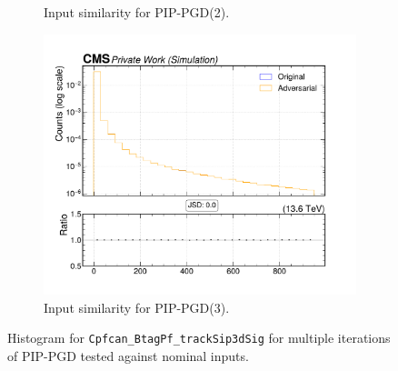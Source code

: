 \begin{figure}[htbp]
\begin{subfigure}[t]{0.32\textwidth}
    \caption*{Input similarity for PIP-PGD(2).}
  \end{subfigure}\hfill
  \begin{subfigure}[t]{0.32\textwidth}
    \includegraphics[width=\linewidth]{media/output/features/compare/combined_it_3/cmp_cpf_arr_Cpfcan_BtagPf_trackSip3dSig.pdf}
    \caption*{Input similarity for PIP-PGD(3).}
  \end{subfigure}

  \caption*{Histogram for \texttt{Cpfcan\_BtagPf\_trackSip3dSig} for multiple iterations of PIP-PGD tested against nominal inputs.}
  \label{fig:combined_input_Cpfcan_BtagPf_trackSip3dSig}
\end{figure}

